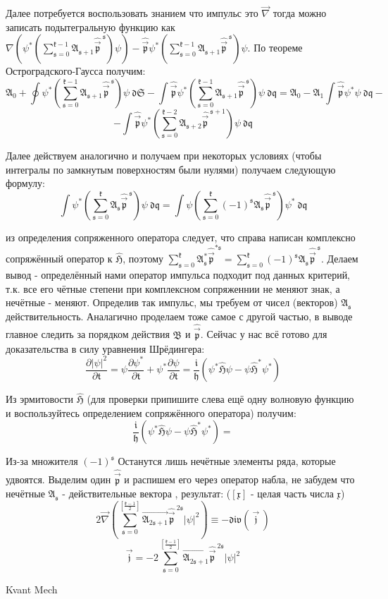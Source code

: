 \par Далее потребуется воспользовать знанием что импульс это $\vec{\nabla}$ тогда можно записать подытегральную функцию как $ \mathfrak{\nabla \left( \psi^* \left( \sum_{s=0}^{k-1} A_{s+1}   \hat{\vec{p}}^{ \ s} \right)  \psi \right) - \hat{\vec{p}} \psi^*   \left( \sum_{s=0}^{k-1} A_{s+1}   \hat{\vec{p}}^{ \ s} \right)  \psi }$. По теореме Остроградского-Гаусса получим:
$$ \mathfrak{ A_0 + \oint \psi^* \left( \sum_{s=0}^{k-1} A_{s+1}   \hat{\vec{p}}^{ \ s} \right)  \psi \ dS - \int \hat{\vec{p}} \psi^*   \left( \sum_{s=0}^{k-1} A_{s+1}   \hat{\vec{p}}^{ \ s} \right)  \psi \ dq  = A_0 - A_1 \int \hat{\vec{p}} \psi^* \psi \ dq - } $$
$$ \mathfrak{ - \int \hat{\vec{p}} \psi^*   \left( \sum_{s=0}^{k-2} A_{s+2}   \hat{\vec{p}}^{ \ s+1} \right)  \psi \ dq }$$
\par Далее действуем аналогично и получаем при некоторых условиях (чтобы интегралы по замкнутым поверхностям были нулями) получаем следующую формулу:
$$ \mathfrak{\int \psi^* \left( \sum_{s=0}^{k} A_s   \hat{\vec{p}}^{ \ s} \right)  \psi \ dq = \int \psi \left( \sum_{s=0}^{k} (-1)^s A_s    \hat{\vec{p}}^{ \ s} \right) \psi^*  \ dq} $$
\par из определения сопряженного оператора следует, что справа написан комплексно сопряжённый оператор к $\mathfrak{\hat{H}}$, поэтому $\mathfrak{ \sum_{s=0}^{k} A_s^*   \hat{\vec{p}}^{*  s} = \sum_{s=0}^{k} (-1)^s A_s \hat{\vec{p}}^{ \ s} }$. Делаем вывод - определённый нами оператор импульса подходит под данных критерий, т.к. все его чётные степени при комплексном сопряженнии не меняют знак, а нечётные - меняют. Определив так импульс, мы требуем от чисел (векторов) $\mathfrak{A_s}$ действительность. Аналагично проделаем тоже самое с другой частью, в  выводе главное следить за порядком действия $\mathfrak{ B}$ и $\mathfrak{ \hat{\vec{p}} }$.  Сейчас у нас всё готово для доказательства в силу уравнения Шрёдингера:
$$ \mathfrak{ \frac{\partial |\psi|^2 }{\partial t} = \psi \frac{\partial \psi^*}{\partial t} + \psi^* \frac{\partial \psi}{\partial t} = \frac{i}{h} \left(  \psi^* \hat{H} \psi - \psi \hat{H}^* \psi^* \right)} $$
\par Из эрмитовости $\mathfrak{\hat{H}}$ (для проверки припишите слева ещё одну волновую функцию и воспользуйтесь определением сопряжённого оператора) получим:
$$ \mathfrak{ \frac{i}{h} \left(  \psi^* \hat{H} \psi - \psi \hat{H}^* \psi^* \right) = }$$
\par Из-за множителя $\mathfrak{(-1)^s}$ Останутся лишь нечётные элементы ряда, которые удвоятся. Выделим один $\mathfrak{\hat{\vec{p}}}$ и распишем его через оператор набла, не забудем что нечётные $\mathfrak{A_s}$ - действительные вектора , результат: ($\mathfrak{[x]}$ - целая часть числа $\mathfrak{x}$)
$$ \mathfrak{ 2 \vec{\nabla} \left( \sum_{s=0}^{[\frac{k-1}{2}]} \vec{A_{2s+1}} \hat{\vec{p}}^{ \ 2s} |\psi|^2 \right)  \equiv -div \! \left( \ \! \vec{j} \ \! \right) } $$
$$ \mathfrak{ \vec{j} = -2 \sum_{s=0}^{[\frac{k-1}{2}]} \vec{A_{2s+1}} \hat{\vec{p}}^{ \ 2s} |\psi|^2  } $$
\par {\gothfamily Kvant Mech}



